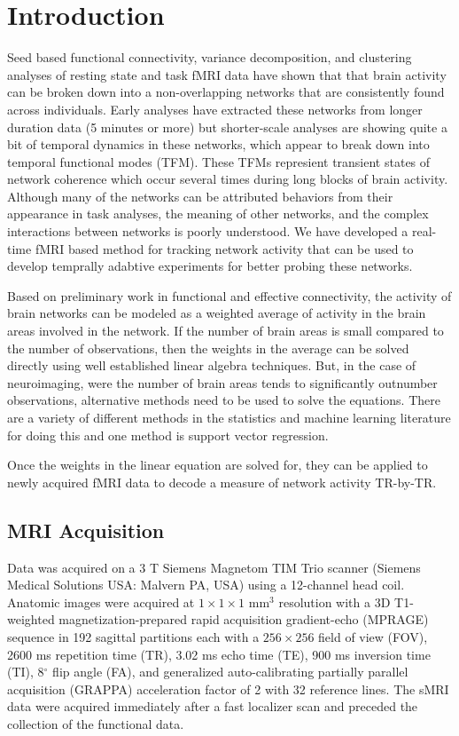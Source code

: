 
\section{Introduction}

Seed based functional connectivity, variance decomposition, and clustering analyses of resting state and task fMRI data have shown that that brain activity can be broken down into a non-overlapping networks that are consistently found across individuals. Early analyses have extracted these networks from longer duration data (5 minutes or more) but shorter-scale analyses are showing quite a bit of temporal dynamics in these networks, which appear to break down into temporal functional modes (TFM). These TFMs represient transient states of network coherence which occur several times during long blocks of brain activity. Although many of the networks can be attributed behaviors from their appearance in task analyses, the meaning of other networks, and the complex interactions between networks is poorly understood. We have developed a real-time fMRI based method for tracking network activity that can be used to develop temprally adabtive experiments for better probing these networks.

Based on preliminary work in functional and effective connectivity, the activity of brain networks can be modeled as a weighted average of activity in the brain areas involved in the network. If the number of brain areas is small compared to the number of observations, then the weights in the average can be solved directly using well established linear algebra techniques. But, in the case of neuroimaging, were the number of brain areas tends to significantly outnumber observations, alternative methods need to be used to solve the equations. There are a variety of different methods in the statistics and machine learning literature for doing this and one method is support vector regression. 

Once the weights in the linear equation are solved for, they can be applied to newly acquired fMRI data to decode a measure of network activity TR-by-TR. 

\subsection{MRI Acquisition}

Data was acquired on a 3 T Siemens Magnetom TIM Trio scanner (Siemens Medical Solutions USA: Malvern PA, USA) using a 12-channel head coil. Anatomic images were acquired at $1 \times 1 \times 1$ mm$^3$ resolution with a 3D T1-weighted magnetization-prepared rapid acquisition gradient-echo (MPRAGE) sequence \cite{Mugler1990} in 192 sagittal partitions each with a $256 \times 256$ field of view (FOV), 2600 ms repetition time (TR), 3.02 ms echo time (TE), 900 ms inversion time (TI), 8$^\circ$ flip angle (FA), and generalized auto-calibrating partially parallel acquisition (GRAPPA) \cite{Griswold2002} acceleration factor of 2 with 32 reference lines. The sMRI data were acquired immediately after a fast localizer scan and preceded the collection of the functional data.


